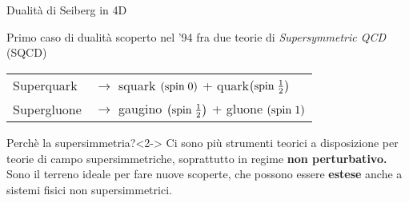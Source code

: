 \documentclass[10pt,compress,usenames,dvipsnames]{beamer}
\begin{document}
\begin{frame}{Dualità di Seiberg in 4D}

Primo caso di dualità scoperto nel '94 fra due teorie di \emph{Supersymmetric QCD} (SQCD)
\begin{table}
\begin{tabular}{l l}
Superquark \quad & $\longrightarrow$ \quad squark $\left( \hbox{spin} \;  0 \right)$ + quark$\left (\hbox{spin} \;  \frac{1}{2} \right)$ \\
Supergluone \quad &  $\longrightarrow$ \quad gaugino $\left (\hbox{spin} \;  \frac{1}{2} \right)$ + gluone  $\left( \hbox{spin} \;  1 \right)$ \\
\end{tabular}
\end{table}

\begin{block}{Perchè la supersimmetria?}<2->
Ci sono più strumenti teorici a disposizione per teorie di campo supersimmetriche,
soprattutto in regime \alert{\bfseries non perturbativo.} \\
\vspace{0.2cm}
Sono il terreno ideale per fare nuove scoperte, che possono essere \alert{\bfseries estese} anche a sistemi fisici non supersimmetrici.

\end{block}


\end{frame}
\end{document}
